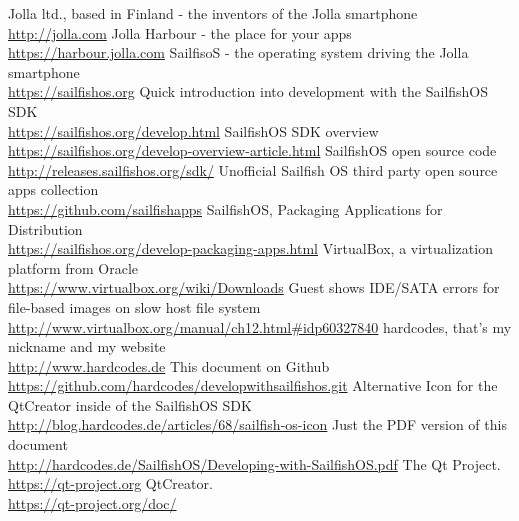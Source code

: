\begin{thebibliography}{xxxxxxxxxxxx}
%
%
  Jolla ltd., based in Finland - the inventors of the Jolla smartphone \\\url{http://jolla.com}
 Jolla Harbour - the place for your apps \\\url{https://harbour.jolla.com}
	SailfisoS - the operating system driving the Jolla smartphone \\\url{https://sailfishos.org}
 Quick introduction into development with the SailfishOS SDK \\\url{https://sailfishos.org/develop.html}
 SailfishOS SDK overview \\\url{https://sailfishos.org/develop-overview-article.html}
 SailfishOS open source code \\\url{http://releases.sailfishos.org/sdk/}
 Unofficial Sailfish OS third party open source apps collection \\\url{https://github.com/sailfishapps}
 SailfishOS, Packaging Applications for Distribution\\\url{https://sailfishos.org/develop-packaging-apps.html}
%
%
 VirtualBox, a virtualization platform from Oracle\\\url{https://www.virtualbox.org/wiki/Downloads}
 Guest shows IDE/SATA errors for file-based images on slow host file system\\\url{http://www.virtualbox.org/manual/ch12.html#idp60327840}
%
%
 hardcodes, that's my nickname and my website\\\url{http://www.hardcodes.de}
 This document on Github\\\url{https://github.com/hardcodes/developwithsailfishos.git}
 Alternative Icon for the QtCreator inside of the SailfishOS SDK\\\url{http://blog.hardcodes.de/articles/68/sailfish-os-icon}
 Just the PDF version of this document \\\url{http://hardcodes.de/SailfishOS/Developing-with-SailfishOS.pdf}
%
%
 The Qt Project. \\\url{https://qt-project.org}
 QtCreator. \\\url{https://qt-project.org/doc/
}
\end{thebibliography}
